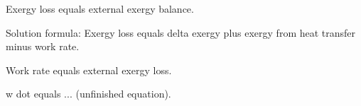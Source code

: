 Exergy loss equals external exergy balance.  

Solution formula:  
Exergy loss equals delta exergy plus exergy from heat transfer minus work rate.  

Work rate equals external exergy loss.  

w dot equals ... (unfinished equation).